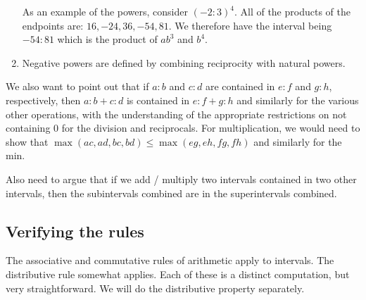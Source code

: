 \documentclass[12pt]{article}
\theoremstyle{remark}
\begin{document}
\begin{enumerate}
As an example of the powers, consider $(-2:3)^4$. All of the products of the endpoints are: $16, -24, 36, -54, 81$. We therefore have the interval being $-54:81$ which is the product of $ab^3$ and $b^4$. 

    
     
    \item Negative powers are defined by combining reciprocity with natural powers. 
\end{enumerate}


We also want to point out that if $a:b$ and $c:d$ are contained in $e:f$ and $g:h$, respectively, then $a:b + c:d $ is contained in $e:f + g:h$ and similarly for the various other operations, with the understanding of the appropriate restrictions on not containing 0 for the division and reciprocals. For multiplication, we would need to show that $\max(ac, ad, bc, bd) \leq \max(eg, eh, fg, fh)$ and similarly for the min. 

Also need to argue that if we add / multiply two intervals contained in two other intervals, then the subintervals combined are in the superintervals combined. 


\subsection{Verifying the rules}

The associative and commutative rules of arithmetic apply to intervals. The distributive rule somewhat applies. Each of these is a distinct computation, but very straightforward. We will do the distributive property separately. 
\end{document}
